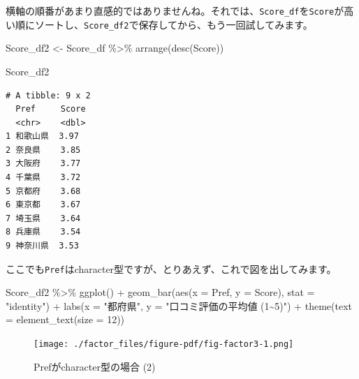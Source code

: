 \documentclass[
  a4paper,
  pandoc,
  ja=standard,
  jafont=haranoaji]{bxjsbook}
\newenvironment{Shaded}{\begin{snugshade}}{\end{snugshade}}
\newcommand{\AttributeTok}[1]{\textcolor[rgb]{0.00,0.48,0.65}{#1}}
\newcommand{\DecValTok}[1]{\textcolor[rgb]{0.68,0.00,0.00}{#1}}
\newcommand{\FunctionTok}[1]{\textcolor[rgb]{0.28,0.35,0.67}{#1}}
\newcommand{\NormalTok}[1]{\textcolor[rgb]{0.00,0.48,0.65}{#1}}
\newcommand{\OtherTok}[1]{\textcolor[rgb]{0.00,0.48,0.65}{#1}}
\newcommand{\SpecialCharTok}[1]{\textcolor[rgb]{0.37,0.37,0.37}{#1}}
\newcommand{\StringTok}[1]{\textcolor[rgb]{0.13,0.47,0.30}{#1}}
\begin{document}
横軸の順番があまり直感的ではありませんね。それでは、\texttt{Score\_df}を\texttt{Score}が高い順にソートし、\texttt{Score\_df2}で保存してから、もう一回試してみます。

\begin{Shaded}
\begin{Highlighting}[numbers=left,,]
\NormalTok{Score\_df2 }\OtherTok{\textless{}{-}}\NormalTok{ Score\_df }\SpecialCharTok{\%\textgreater{}\%}
  \FunctionTok{arrange}\NormalTok{(}\FunctionTok{desc}\NormalTok{(Score))}

\NormalTok{Score\_df2}
\end{Highlighting}
\end{Shaded}

\begin{verbatim}
# A tibble: 9 x 2
  Pref     Score
  <chr>    <dbl>
1 和歌山県  3.97
2 奈良県    3.85
3 大阪府    3.77
4 千葉県    3.72
5 京都府    3.68
6 東京都    3.67
7 埼玉県    3.64
8 兵庫県    3.54
9 神奈川県  3.53
\end{verbatim}

ここでも\texttt{Pref}はcharacter型ですが、とりあえず、これで図を出してみます。

\begin{Shaded}
\begin{Highlighting}[numbers=left,,]
\NormalTok{Score\_df2 }\SpecialCharTok{\%\textgreater{}\%}
  \FunctionTok{ggplot}\NormalTok{() }\SpecialCharTok{+}
  \FunctionTok{geom\_bar}\NormalTok{(}\FunctionTok{aes}\NormalTok{(}\AttributeTok{x =}\NormalTok{ Pref, }\AttributeTok{y =}\NormalTok{ Score), }\AttributeTok{stat =} \StringTok{"identity"}\NormalTok{) }\SpecialCharTok{+}
  \FunctionTok{labs}\NormalTok{(}\AttributeTok{x =} \StringTok{"都府県"}\NormalTok{, }\AttributeTok{y =} \StringTok{"口コミ評価の平均値 (1\textasciitilde{}5)"}\NormalTok{) }\SpecialCharTok{+}
  \FunctionTok{theme}\NormalTok{(}\AttributeTok{text =} \FunctionTok{element\_text}\NormalTok{(}\AttributeTok{size =} \DecValTok{12}\NormalTok{))}
\end{Highlighting}
\end{Shaded}

\begin{figure}[H]

{\centering \texttt{[image: ./factor\_files/figure-pdf/fig-factor3-1.png]}

}

\caption{\label{fig-factor3}Prefがcharacter型の場合 (2)}

\end{figure}
\end{document}
